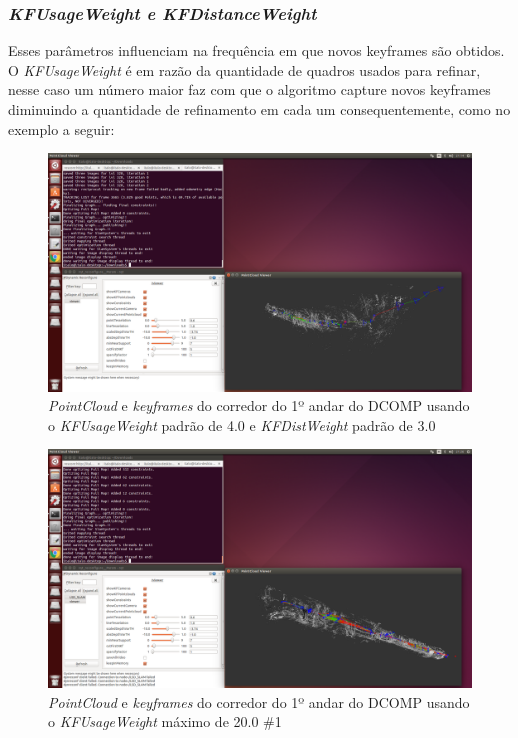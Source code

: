 \subsubsection{\textit{KFUsageWeight e KFDistanceWeight}}


Esses parâmetros influenciam na frequência em que novos keyframes são obtidos. O \textit{KFUsageWeight} é em razão da quantidade de quadros usados para refinar, nesse caso um número maior faz com que o algoritmo capture novos keyframes diminuindo a quantidade de refinamento em cada um consequentemente, como no exemplo a seguir:

\begin{figure}[!htb]
	\centering
		\includegraphics[width= \textwidth]{Imagens/figura3-33.png}
	\caption{\textit{PointCloud} e \textit{keyframes} do corredor do 1º andar do DCOMP usando o \textit{KFUsageWeight} padrão de 4.0 e \textit{KFDistWeight} padrão de 3.0}
	\label{fig3:31}
\end{figure}

\begin{figure}[!htb]
	\centering
		\includegraphics[width= \textwidth]{Imagens/figura3-34.png}
	\caption{\textit{PointCloud} e \textit{keyframes} do corredor do 1º andar do DCOMP usando o \textit{KFUsageWeight} máximo de 20.0 \#1}
	\label{fig3:32}
\end{figure}


